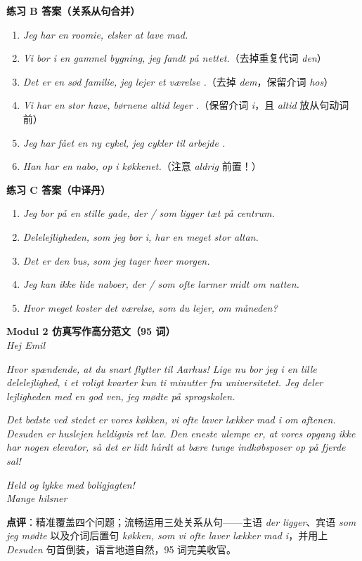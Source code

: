 \begin{answerbox}
\textbf{练习 B 答案（关系从句合并）}
\begin{enumerate}
  \item \textit{Jeg har en roomie,  elsker at lave mad.}
  \item \textit{Vi bor i en gammel bygning,  jeg fandt på nettet.}（去掉重复代词 \textit{den}）
  \item \textit{Det er en sød familie,  jeg lejer et værelse .}（去掉 \textit{dem}，保留介词 \textit{hos}）
  \item \textit{Vi har en stor have,  børnene altid leger .}（保留介词 \textit{i}，且 \textit{altid} 放从句动词前）
  \item \textit{Jeg har fået en ny cykel,  jeg cykler til arbejde .}
  \item \textit{Han har en nabo,   op i køkkenet.}（注意 \textit{aldrig} 前置！）
\end{enumerate}

\textbf{练习 C 答案（中译丹）}
\begin{enumerate}
  \item \textit{Jeg bor på en stille gade, der / som ligger tæt på centrum.}
  \item \textit{Delelejligheden, som jeg bor i, har en meget stor altan.}
  \item \textit{Det er den bus, som jeg tager hver morgen.}
  \item \textit{Jeg kan ikke lide naboer, der / som ofte larmer midt om natten.}
  \item \textit{Hvor meget koster det værelse, som du lejer, om måneden?}
\end{enumerate}

\textbf{Modul 2 仿真写作高分范文（95 词）}\\
\textit{Hej Emil}

\textit{Hvor spændende, at du snart flytter til Aarhus! Lige nu bor jeg i en lille delelejlighed,  i et roligt kvarter kun ti minutter fra universitetet. Jeg deler lejligheden med en god ven,  jeg mødte på sprogskolen.}

\textit{Det bedste ved stedet er vores køkken,  vi ofte laver lækker mad i om aftenen. Desuden er huslejen heldigvis ret lav. Den eneste ulempe er, at vores opgang ikke har nogen elevator, så det er lidt hårdt at bære tunge indkøbsposer op på fjerde sal!}

\textit{Held og lykke med boligjagten!\\
Mange hilsner\\
}

\small\textbf{点评}：精准覆盖四个问题；流畅运用三处关系从句——主语 \textit{der ligger}、宾语 \textit{som jeg mødte} 以及介词后置句 \textit{køkken, som vi ofte laver lækker mad i}，并用上 \textit{Desuden} 句首倒装，语言地道自然，95 词完美收官。
\end{answerbox}
